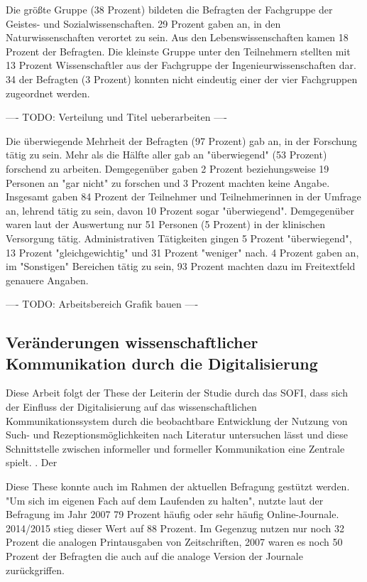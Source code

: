 Die größte Gruppe (38 Prozent) bildeten die Befragten der Fachgruppe der Geistes- und Sozialwissenschaften. 29 Prozent gaben an, in den Naturwissenschaften verortet zu sein. Aus den Lebenswissenschaften kamen 18 Prozent der Befragten. Die kleinste Gruppe unter den Teilnehmern stellten mit 13 Prozent Wissenschaftler aus der Fachgruppe der Ingenieurwissenschaften dar. 34 der Befragten (3 Prozent) konnten nicht eindeutig einer der vier Fachgruppen zugeordnet werden.

---- TODO: Verteilung und Titel ueberarbeiten ----

Die überwiegende Mehrheit der Befragten (97 Prozent) gab an, in der Forschung tätig zu sein. Mehr als die Hälfte aller gab an "überwiegend" (53 Prozent) forschend zu arbeiten. Demgegenüber gaben 2 Prozent beziehungsweise 19 Personen an "gar nicht" zu forschen und 3 Prozent machten keine Angabe. Insgesamt gaben 84 Prozent der Teilnehmer und Teilnehmerinnen in der Umfrage an, lehrend tätig zu sein, davon 10 Prozent sogar "überwiegend". Demgegenüber waren laut der Auswertung nur 51 Personen (5 Prozent) in der klinischen Versorgung tätig. Administrativen Tätigkeiten gingen 5 Prozent "überwiegend", 13 Prozent "gleichgewichtig" und 31 Prozent "weniger" nach. 4 Prozent gaben an, im "Sonstigen" Bereichen tätig zu sein, 93 Prozent machten dazu im Freitextfeld genauere Angaben.

---- TODO: Arbeitsbereich Grafik bauen ----

\subsection{Veränderungen wissenschaftlicher Kommunikation durch die Digitalisierung}

Diese Arbeit folgt der These der Leiterin der Studie durch das SOFI, dass sich der Einfluss der Digitalisierung auf das wissenschaftlichen Kommunikationssystem  durch die beobachtbare Entwicklung der Nutzung von Such- und Rezeptionsmöglichkeiten nach Literatur untersuchen lässt und diese Schnittstelle zwischen informeller und formeller Kommunikation eine Zentrale spielt. \cite{Hanekop_2014}. Der

Diese These konnte auch im Rahmen der aktuellen Befragung gestützt werden. "Um sich im eigenen Fach auf dem Laufenden zu halten", nutzte laut der Befragung im Jahr 2007 79 Prozent häufig oder sehr häufig Online-Journale. 2014/2015 stieg dieser Wert auf 88 Prozent. Im Gegenzug nutzen nur noch 32 Prozent die analogen Printausgaben von Zeitschriften, 2007 waren es noch 50 Prozent der Befragten die auch auf die analoge Version der Journale zurückgriffen.

